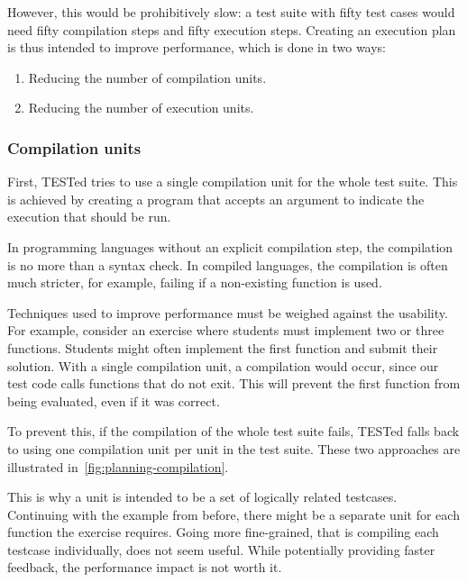 \documentclass[../main]{subfiles}
\begin{document}
However, this would be prohibitively slow: a test suite with fifty test cases would need fifty compilation steps and fifty execution steps.
Creating an execution plan is thus intended to improve performance, which is done in two ways:

\begin{enumerate}
    \item Reducing the number of compilation units.
    \item Reducing the number of execution units.
\end{enumerate}

\subsubsection{Compilation units}

First, TESTed tries to use a single compilation unit for the whole test suite.
This is achieved by creating a program that accepts an argument to indicate the execution that should be run.

In programming languages without an explicit compilation step, the compilation is no more than a syntax check.
In compiled languages, the compilation is often much stricter, for example, failing if a non-existing function is used.

Techniques used to improve performance must be weighed against the usability.
For example, consider an exercise where students must implement two or three functions.
Students might often implement the first function and submit their solution.
With a single compilation unit, a compilation would occur, since our test code calls functions that do not exit.
This will prevent the first function from being evaluated, even if it was correct.

To prevent this, if the compilation of the whole test suite fails, TESTed falls back to using one compilation unit per unit in the test suite.
These two approaches are illustrated in~\cref{fig:planning-compilation}.

This is why a unit is intended to be a set of logically related testcases.
Continuing with the example from before, there might be a separate unit for each function the exercise requires.
Going more fine-grained, that is compiling each testcase individually, does not seem useful.
While potentially providing faster feedback, the performance impact is not worth it.
\end{document}
